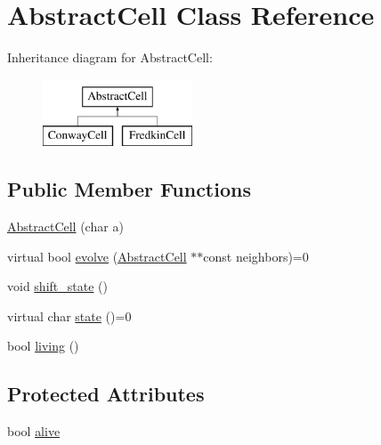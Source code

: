 \hypertarget{classAbstractCell}{\section{Abstract\-Cell Class Reference}
\label{classAbstractCell}
}
Inheritance diagram for Abstract\-Cell\-:\begin{figure}[H]
\begin{center}
\leavevmode
\includegraphics[height=2.000000cm]{classAbstractCell}
\end{center}
\end{figure}
\subsection*{Public Member Functions}
\begin{DoxyCompactItemize}
\item 
\hyperlink{classAbstractCell_a3f812bfb6db500d89323a4445bf2447f}{Abstract\-Cell} (char a)
\item 
virtual bool \hyperlink{classAbstractCell_ac2c599d61d1bafb09468b48204482f8b}{evolve} (\hyperlink{classAbstractCell}{Abstract\-Cell} $\ast$$\ast$const neighbors)=0
\item 
void \hyperlink{classAbstractCell_ae3d3e5b983c437cb77abffa49c8772e3}{shift\-\_\-state} ()
\item 
virtual char \hyperlink{classAbstractCell_a69ec6d128bfd858512fe6cb49676a03d}{state} ()=0
\item 
bool \hyperlink{classAbstractCell_aba811f858a0ec0c7e1d5f76960f78948}{living} ()
\end{DoxyCompactItemize}
\subsection*{Protected Attributes}
\begin{DoxyCompactItemize}
\item 
bool \hyperlink{classAbstractCell_aa92e42d5bb67f3249d8e2dde2c3228e7}{alive}
\end{DoxyCompactItemize}


